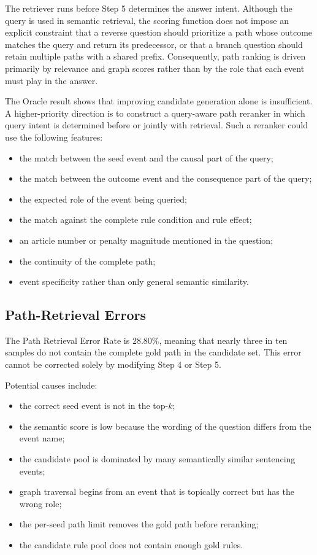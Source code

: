 The retriever runs before Step 5 determines the answer intent. Although the
query is used in semantic retrieval, the scoring function does not impose an
explicit constraint that a reverse question should prioritize a path whose
outcome matches the query and return its predecessor, or that a branch
question should retain multiple paths with a shared prefix. Consequently,
path ranking is driven primarily by relevance and graph scores rather than
by the role that each event must play in the answer.

The Oracle result shows that improving candidate generation alone is
insufficient. A higher-priority direction is to construct a query-aware path
reranker in which query intent is determined before or jointly with
retrieval. Such a reranker could use the following features:

\begin{itemize}
    \item the match between the seed event and the causal part of the query;
    \item the match between the outcome event and the consequence part of
    the query;
    \item the expected role of the event being queried;
    \item the match against the complete rule condition and rule effect;
    \item an article number or penalty magnitude mentioned in the question;
    \item the continuity of the complete path;
    \item event specificity rather than only general semantic similarity.
\end{itemize}

\subsection{Path-Retrieval Errors}

The Path Retrieval Error Rate is \(28.80\%\), meaning that nearly three in
ten samples do not contain the complete gold path in the candidate set.
This error cannot be corrected solely by modifying Step 4 or Step 5.

Potential causes include:

\begin{itemize}
    \item the correct seed event is not in the top-\(k\);
    \item the semantic score is low because the wording of the question
    differs from the event name;
    \item the candidate pool is dominated by many semantically similar
    sentencing events;
    \item graph traversal begins from an event that is topically correct but
    has the wrong role;
    \item the per-seed path limit removes the gold path before reranking;
    \item the candidate rule pool does not contain enough gold rules.
\end{itemize}

